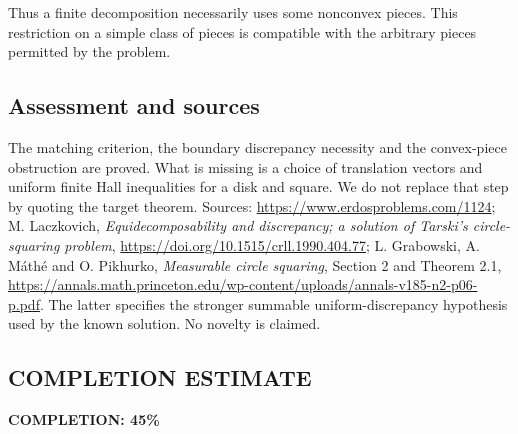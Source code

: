 Thus a finite decomposition necessarily uses some nonconvex pieces. This restriction on a simple class of pieces is compatible with the arbitrary pieces permitted by the problem.

\subsection*{Assessment and sources}
The matching criterion, the boundary discrepancy necessity and the convex-piece obstruction are proved. What is missing is a choice of translation vectors and uniform finite Hall inequalities for a disk and square. We do not replace that step by quoting the target theorem.
Sources: \url{https://www.erdosproblems.com/1124}; M. Laczkovich, \emph{Equidecomposability and discrepancy; a solution of Tarski's circle-squaring problem}, \url{https://doi.org/10.1515/crll.1990.404.77}; L. Grabowski, A. M\'ath\'e and O. Pikhurko, \emph{Measurable circle squaring}, Section 2 and Theorem 2.1, \url{https://annals.math.princeton.edu/wp-content/uploads/annals-v185-n2-p06-p.pdf}. The latter specifies the stronger summable uniform-discrepancy hypothesis used by the known solution. No novelty is claimed.
\subsection*{COMPLETION ESTIMATE}
\textbf{COMPLETION: 45\%}
